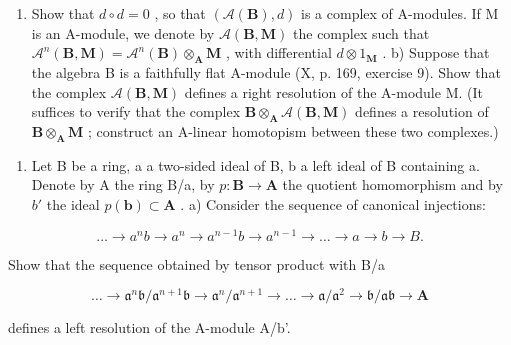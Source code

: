 \begin{enumerate}
\def\labelenumi{\alph{enumi})}
\tightlist
\item
  Show that \(d \circ d = 0\) , so that \((\mathcal{A}(\mathbf{B}), d)\) is a complex of A-modules. If M is an A-module, we denote by \(\mathcal{A}(\mathbf{B}, \mathbf{M})\) the complex such that \(\mathcal{A}^{n}(\mathbf{B}, \mathbf{M}) = \mathcal{A}^{n}(\mathbf{B}) \otimes_{\mathbf{A}} \mathbf{M}\) , with differential \(d \otimes 1_{\mathbf{M}}\) . b) Suppose that the algebra B is a faithfully flat A-module (X, p. 169, exercise 9). Show that the complex \(\mathcal{A}(\mathbf{B}, \mathbf{M})\) defines a right resolution of the A-module M. (It suffices to verify that the complex \(\mathbf{B} \otimes_{\mathbf{A}} \mathcal{A}(\mathbf{B}, \mathbf{M})\) defines a resolution of \(\mathbf{B} \otimes_{\mathbf{A}} \mathbf{M}\) ; construct an A-linear homotopism between these two complexes.)
\end{enumerate}

\begin{enumerate}
\def\labelenumi{\arabic{enumi})}
\setcounter{enumi}{2}
\tightlist
\item
  Let B be a ring, a a two-sided ideal of B, b a left ideal of B containing a. Denote by A the ring B/a, by \(p: \mathbf{B} \to \mathbf{A}\) the quotient homomorphism and by \(b'\) the ideal \(p(\mathbf{b}) \subset \mathbf{A}\) . a) Consider the sequence of canonical injections:
\end{enumerate}

\[
\dots \rightarrow a ^ {n} b \rightarrow a ^ {n} \rightarrow a ^ {n - 1} b \rightarrow a ^ {n - 1} \rightarrow \dots \rightarrow a \rightarrow b \rightarrow B.
\]

Show that the sequence obtained by tensor product with B/a

\[
\dots \rightarrow \mathfrak {a} ^ {n} \mathfrak {b} / \mathfrak {a} ^ {n + 1} \mathfrak {b} \rightarrow \mathfrak {a} ^ {n} / \mathfrak {a} ^ {n + 1} \rightarrow \dots \rightarrow \mathfrak {a} / \mathfrak {a} ^ {2} \rightarrow \mathfrak {b} / \mathfrak {a b} \rightarrow \mathbf {A}
\]

defines a left resolution of the A-module A/b'.

